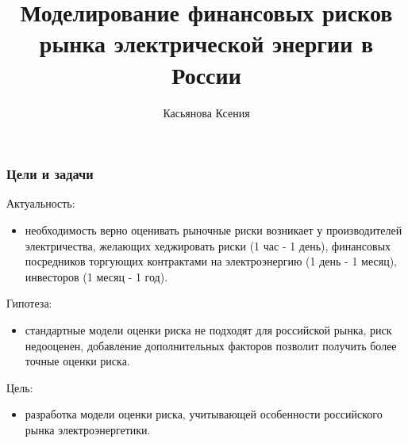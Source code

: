 \documentclass[c, dvipsnames]{beamer}  %
\title[   Моделирование финансовых рисков     ]{Моделирование финансовых рисков    рынка электрической энергии в России }
\author[Касьянова Ксения]{Касьянова Ксения \\ \smallskip \scriptsize  }
\institute[РАНХиГС]{ \uppercase{
  Институт отраслевых рынков и инфраструктуры}}
\date{}
\begin{document}
\frame[plain]{\titlepage}	%

\begin{frame}[shrink=3]
\frametitle{Цели и задачи} 


\begin{block}{Актуальность:}
	\begin{itemize}
		
		\item необходимость верно оценивать рыночные риски возникает у производителей электричества, желающих хеджировать  риски (1 час - 1 день),    финансовых посредников  торгующих контрактами на электроэнергию (1 день - 1 месяц), инвесторов (1 месяц - 1 год).
%				
		


	\end{itemize}
\end{block}


\begin{block}{Гипотеза:}
	\begin{itemize}
		
		\item стандартные модели оценки риска не подходят для российской рынка, риск недооценен, добавление дополнительных факторов позволит получить более точные оценки риска. 
	
		
		
		
	\end{itemize}
\end{block}


\begin{block}{Цель:}
	\begin{itemize}
		
		
		\item  разработка модели оценки риска,  учитывающей  особенности российского рынка электроэнергетики. 
		
		
		

		

\end{itemize}
\end{block}
\end{frame}
\end{document}
